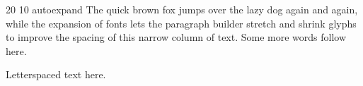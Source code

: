   
\pdffontexpand{} 20 10 autoexpand
\lsrm{}
\hsize=2.5in
\tenrm The quick brown fox jumps over the lazy dog again and again, while the
expansion of fonts lets the paragraph builder stretch and shrink glyphs to
improve the spacing of this narrow column of text. Some more words follow here.
\par\lsrm Letterspaced text here.
\bye

